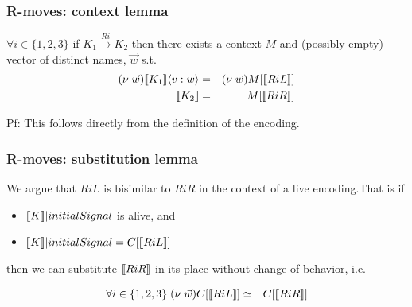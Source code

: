 \documentclass{beamer}
\begin{document}

\begin{frame}
  \frametitle{R-moves: context lemma}
  
  $\forall i \in \{ 1, 2, 3 \}$ \; if $K_{1}
  \stackrel{Ri}{\rightarrow} K_{2}$ then there exists a context $M$
  and (possibly empty) vector of distinct names, $\vec{w}$ s.t.
  \begin{eqnarray}
    (\nu \; \vec{w})\meaningof{K_{1}}\langle v:w\rangle & = & (\nu \; \vec{w})M[ \meaningof{RiL} ] \nonumber \\
    \meaningof{K_{2}} & = & M[ \meaningof{RiR} ] \nonumber
  \end{eqnarray}

  Pf: This follows directly from the definition of the encoding.

\end{frame}

\begin{frame}
  \frametitle{R-moves: substitution lemma}
  We argue that $RiL$ is bisimilar to $RiR$ in the context of a live encoding.That is if
  \begin{itemize}
    \item $[\![ K ]\!] | initialSignal$ is alive, and
    \item $[\![ K ]\!] | initialSignal = C[ [\![ RiL ]\!] ]$
  \end{itemize}

  then we can substitute $[\![ RiR ]\!]$ in its place without change of behavior, i.e.
  
  \begin{eqnarray}
    \forall i \in \{ 1, 2, 3 \} \; (\nu \; \vec{w})C[ [\![ RiL ]\!] ] & \simeq & C[ [\![ RiR ]\!] ] \nonumber
  \end{eqnarray}
\end{frame}
\end{document}
